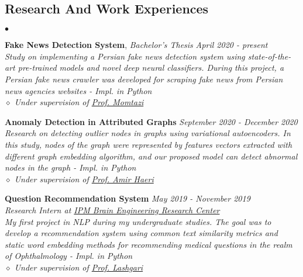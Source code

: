 \documentclass[margin,line]{res}
\newenvironment{list2}{
\begin{list}{$\bullet$}{
		\setlength{\itemsep}{0in}
		\setlength{\parsep}{0in} \setlength{\parskip}{0in}
		\setlength{\topsep}{0in} \setlength{\partopsep}{0in} 
		\setlength{\leftmargin}{0.2in}}}{\end{list}}
\begin{document}
\begin{resume}
	\section{\sc Research And Work Experiences}
	\begin{list2}
		\item \textbf{Fake News Detection System}, \textit{Bachelor’s Thesis} \hfill \sl{\textit{April 2020 - present}} \\
		Study on implementing a Persian fake news detection system using state-of-the-art pre-trained models and novel deep neural classifiers. During this project, a Persian fake news crawler was developed for scraping fake news from Persian news agencies websites - \textit{Impl. in Python} \\
		$\diamond$ Under supervision of \href{mailto:momtazi@aut.ac.ir}{Prof. Momtazi}
		\vspace{0.05in}
		\item \textbf{Anomaly Detection in Attributed Graphs} \hfill \sl{September 2020 - December 2020} \\
		Research on detecting outlier nodes in graphs using variational autoencoders. In this study, nodes of the graph were represented by features vectors extracted with different graph embedding algorithm, and our proposed model can detect abnormal nodes in the graph - \textit{Impl. in Python} \\
		$\diamond$ Under supervision of \href{mailto:m.amirhaeri@utwente.nl}{Prof. Amir Haeri}
		\vspace{0.05in}
		\item \textbf{Question Recommendation System} \hfill \sl{\textit{May 2019 - November 2019}} \\
		Research Intern at \href{http://braineng.scs.ipm.ac.ir/}{IPM Brain Engineering Research Center} \\
		My first project in NLP during my undergraduate studies. The goal
		was to develop a recommendation system using common text similarity metrics
		and static word embedding methods for recommending medical questions in the
		realm of Ophthalmology - \textit{Impl. in Python} \\
		$\diamond$ Under supervision of \href{mailto:rezalashgari@ipm.ir}{Prof. Lashgari}
		\vspace{0.05in}
		

\end{list2}
\end{resume}
\end{document}
